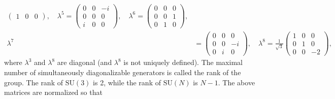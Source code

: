 \begin{equation}
\begin{aligned}
\begin{pmatrix}
                          1 & 0 & 0
                      \end{pmatrix}, \quad \lambda^5 = \begin{pmatrix}
                                                           0 & 0 & -i \\
                                                           0 & 0 & 0  \\
                                                           i & 0 & 0
                                                       \end{pmatrix}, \quad \lambda^6 = \begin{pmatrix}
                                                                                            0 & 0 & 0 \\
                                                                                            0 & 0 & 1 \\
                                                                                            0 & 1 & 0
                                                                                        \end{pmatrix}, \\
        \lambda^7 & = \begin{pmatrix}
                          0 & 0 & 0  \\
                          0 & 0 & -i \\
                          0 & i & 0
                      \end{pmatrix}, \quad \lambda^8 = \frac{1}{\sqrt{3}} \begin{pmatrix}
                                                                              1 & 0 & 0  \\
                                                                              0 & 1 & 0  \\
                                                                              0 & 0 & -2
                                                                          \end{pmatrix},
    \end{aligned}
    \label{eq:Gell-Mann_matrices}
\end{equation}
where \(\lambda^3\) and \(\lambda^8\) are diagonal (and \(\lambda^8\) is not uniquely defined). The maximal number of simultaneously diagonalizable generators is called the rank of the group. The rank of \(\mathrm{SU}(3)\) is 2, while the rank of \(\mathrm{SU}(N)\) is \(N - 1\). The above matrices are normalized so that
